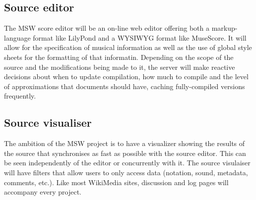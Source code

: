 \documentclass{article}
\begin{document}
\subsection{Source editor}
The MSW score editor will be an on-line web editor offering both a
markup-language format like LilyPond and a WYSIWYG format like MuseScore.
It will allow for the specification of musical information as well as the
use of global style sheets for the formatting of that informatin.  Depending
on the scope of the source and the modifications being made to it, the
server will make reactive decisions about when to update compilation, how
much to compile and the level of approximations that documents should have,
caching fully-compiled versions frequently.
\subsection{Source visualiser}
The ambition of the MSW project is to have a visualizer showing the results
of the source that synchronises as fast as possible with the source editor.
This can be seen independently of the editor or concurrently with it. The
source visulaiser will have filters that allow users to only access
data (notation, sound, metadata, comments, etc.). Like most WikiMedia sites,
discussion and log pages will accompany every project.
\end{document}
